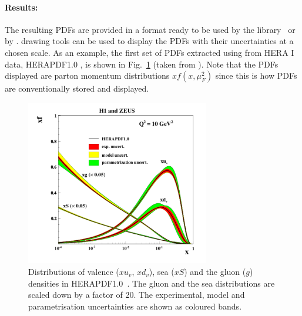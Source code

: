 \paragraph{Results:}
The resulting PDFs are provided in a format ready to be used by the \lhapdf 
library~\cite{lhapdf,lhapdfweb} or by \tmdlib \cite{Hautmann:2014kza}.
\fitter drawing tools can be used to display the PDFs with their uncertainties at a chosen scale.  
As an example, the first set of PDFs extracted using \fitter from HERA I data, HERAPDF1.0 \cite{h1zeus:2009wt}, 
is shown in Fig.~\ref{fig:hera1} (taken from \cite{h1zeus:2009wt}).
 Note that the PDFs displayed are parton momentum distributions $xf(x,\mu_F^2)$ since this is how PDFs are conventionally stored and displayed.
\begin{figure}[!ht]
   \centering
   \includegraphics[width=8cm]{hera1.pdf}
   \caption{Distributions of valence ($xu_v$, $xd_v$), sea ($xS$) and the gluon ($g$) densities in HERAPDF1.0~\cite{h1zeus:2009wt}. 
       The gluon and the sea distributions are scaled down by a factor of 20.
       The experimental, model and parametrisation uncertainties are shown as coloured bands.}
 \label{fig:hera1}
\end{figure}


